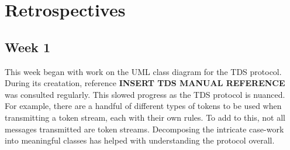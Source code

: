 \documentclass[../design_doc.tex]{subfiles}
\begin{document}
\section{Retrospectives}\label{sec:retro}
    \subsection{Week 1}\label{sec:retro:week1}
        This week began with work on the UML class diagram for the TDS protocol. During its creatation, reference \textbf{INSERT TDS MANUAL REFERENCE} was consulted regularly. This slowed progress as the TDS protocol is nuanced. For example, there are a handful of different types of tokens to be used when transmitting a token stream, each with their own rules. To add to this, not all messages transmitted are token streams. Decomposing the intricate case-work into meaningful classes has helped with understanding the protocol overall.
\end{document}
